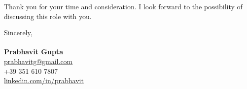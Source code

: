 \documentclass[11pt,a4paper]{article}
\begin{document}
\vspace{1em}

\noindent
Thank you for your time and consideration. I look forward to the possibility of discussing this role with you.

\vspace{2em}

\noindent
Sincerely, \\
\vspace{1em} \\
\textbf{Prabhavit Gupta} \\
\href{mailto:prabhavitg@gmail.com}{prabhavitg@gmail.com} \\
+39 351 610 7807 \\
\href{https://www.linkedin.com/in/prabhavit/}{linkedin.com/in/prabhavit}
\end{document}
